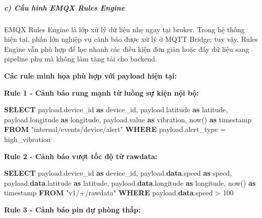 \documentclass[13pt,a4paper]{extarticle}
\newenvironment{Shaded}{}{}
\newcommand{\DataTypeTok}[1]{\textcolor[rgb]{0.56,0.13,0.00}{#1}}
\newcommand{\DecValTok}[1]{\textcolor[rgb]{0.25,0.63,0.44}{#1}}
\newcommand{\FunctionTok}[1]{\textcolor[rgb]{0.02,0.16,0.49}{#1}}
\newcommand{\KeywordTok}[1]{\textcolor[rgb]{0.00,0.44,0.13}{\textbf{#1}}}
\newcommand{\NormalTok}[1]{#1}
\newcommand{\OperatorTok}[1]{\textcolor[rgb]{0.40,0.40,0.40}{#1}}
\newcommand{\OtherTok}[1]{\textcolor[rgb]{0.00,0.44,0.13}{#1}}
\newcommand{\StringTok}[1]{\textcolor[rgb]{0.25,0.44,0.63}{#1}}
\renewcommand{\\}{\thesislongtableorignewline\hline}%
\begin{document}
\subparagraph{c) Cấu hình EMQX Rules
Engine}\label{c-cux1ea5u-huxecnh-emqx-rules-engine}

EMQX Rules Engine là lớp xử lý dữ liệu nhẹ ngay tại broker. Trong hệ
thống hiện tại, phần lớn nghiệp vụ cảnh báo được xử lý ở MQTT Bridge;
tuy vậy, Rules Engine vẫn phù hợp để lọc nhanh các điều kiện đơn giản
hoặc đẩy dữ liệu sang pipeline phụ mà không làm tăng tải cho backend.

\textbf{Các rule minh họa phù hợp với payload hiện tại:}

\textbf{Rule 1 - Cảnh báo rung mạnh từ luồng sự kiện nội bộ:}

\begin{Shaded}
\begin{Highlighting}[]
\KeywordTok{SELECT}
\NormalTok{  payload.device\_id }\KeywordTok{as}\NormalTok{ device\_id,}
\NormalTok{  payload.latitude }\KeywordTok{as}\NormalTok{ latitude,}
\NormalTok{  payload.longitude }\KeywordTok{as}\NormalTok{ longitude,}
\NormalTok{  payload.}\FunctionTok{value} \KeywordTok{as}\NormalTok{ vibration,}
\NormalTok{  now() }\KeywordTok{as} \DataTypeTok{timestamp}
\KeywordTok{FROM} \OtherTok{"internal/events/device/alert"}
\KeywordTok{WHERE}\NormalTok{ payload.alert\_type }\OperatorTok{=} \StringTok{\textquotesingle{}high\_vibration\textquotesingle{}}
\end{Highlighting}
\end{Shaded}

\textbf{Rule 2 - Cảnh báo vượt tốc độ từ rawdata:}

\begin{Shaded}
\begin{Highlighting}[]
\KeywordTok{SELECT}
\NormalTok{  payload.device\_id }\KeywordTok{as}\NormalTok{ device\_id,}
\NormalTok{  payload.}\KeywordTok{data}\NormalTok{.speed }\KeywordTok{as}\NormalTok{ speed,}
\NormalTok{  payload.}\KeywordTok{data}\NormalTok{.latitude }\KeywordTok{as}\NormalTok{ latitude,}
\NormalTok{  payload.}\KeywordTok{data}\NormalTok{.longitude }\KeywordTok{as}\NormalTok{ longitude,}
\NormalTok{  now() }\KeywordTok{as} \DataTypeTok{timestamp}
\KeywordTok{FROM} \OtherTok{"v1/+/rawdata"}
\KeywordTok{WHERE}\NormalTok{ payload.}\KeywordTok{data}\NormalTok{.speed }\OperatorTok{\textgreater{}} \DecValTok{100}
\end{Highlighting}
\end{Shaded}

\textbf{Rule 3 - Cảnh báo pin dự phòng thấp:}
\end{document}
